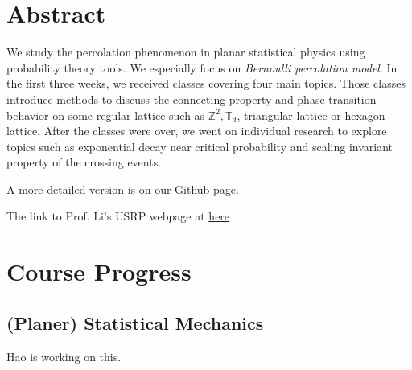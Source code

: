 \documentclass[12pt]{article}
\author{Chia-Cheng, Hao \quad Le-Rong, Hsu \quad Wei-Chieh, Hung \quad TBD \quad TBD \quad TBD}
\theoremstyle{plane}
\theoremstyle{definition}
\begin{document}
\clearpage\maketitle
\thispagestyle{empty}

\newpage
\setcounter{page}{1}
\section{Abstract}
We study the percolation phenomenon in planar statistical physics using probability theory tools. We especially focus on \textit{Bernoulli percolation model}. 
In the first three weeks, we received classes covering four main topics. Those classes introduce methods to discuss the connecting property and phase transition behavior on some regular lattice such as $\mathbb{Z}^2,\mathbb{T}_d$, triangular lattice or hexagon lattice. 
After the classes were over, we went on individual research to explore topics such as exponential decay near critical probability and scaling invariant property of the crossing events.

A more detailed version is on our \href{https://github.com/ausernamess/2022USRP-Group-7/blob/main/main.pdf}{Github} page. 

The link to Prof. Li's USRP webpage at \href{https://usrp2022.cadlag.space/}{here}
\section{Course Progress}

\setcounter{subsection}{-1}
\subsection{(Planer) Statistical Mechanics}
Hao is working on this.


\end{document}
